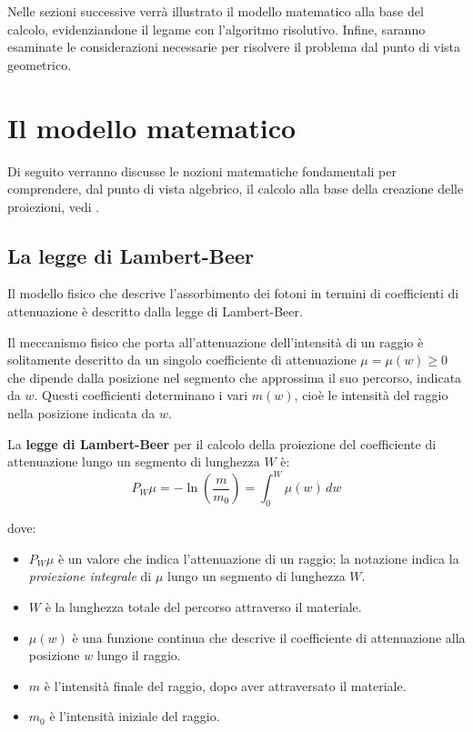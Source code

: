 \documentclass[12pt,a4paper]{report}
\begin{document}
Nelle sezioni successive verrà illustrato il modello matematico alla base del calcolo, evidenziandone il legame con l'algoritmo
risolutivo.
Infine, saranno esaminate le considerazioni necessarie per risolvere il problema dal punto di vista geometrico.

\section{Il modello matematico}

Di seguito verranno discusse le nozioni matematiche fondamentali per comprendere, dal punto di vista algebrico, il calcolo
alla base della creazione delle proiezioni, vedi \cite{MoroLoli2021}.

\subsection{La legge di Lambert-Beer}

Il modello fisico che descrive l'assorbimento dei fotoni in termini di coefficienti di attenuazione è descritto dalla legge di
Lambert-Beer.

Il meccanismo fisico che porta all'attenuazione dell'intensità di un raggio è solitamente descritto da un singolo coefficiente di
attenuazione \(\mu = \mu(w) \ge 0\) che dipende dalla posizione nel segmento che approssima il suo percorso, indicata da \(w\).
Questi coefficienti determinano i vari \(m(w)\), cioè le intensità del raggio nella posizione indicata da \(w\).

La \textbf{legge di Lambert-Beer} per il calcolo della proiezione del coefficiente di attenuazione lungo un segmento di lunghezza
\(W\) è:
\begin{equation} \label{eq:law_lambert-beer}
  P_W\mu = - \ln{(\frac{m}{m_0})} = \int_0^W \mu(w) \, dw
\end{equation}

dove:
\begin{itemize}
  \item \(P_W\mu\) è un valore che indica l'attenuazione di un raggio; la notazione indica la \textit{proiezione integrale} di
        \(\mu\) lungo un segmento di lunghezza \(W\).
  \item \(W\) è la lunghezza totale del percorso attraverso il materiale.
  \item \(\mu(w)\) è una funzione continua che descrive il coefficiente di attenuazione alla posizione \(w\) lungo il raggio.
  \item \(m\) è l'intensità finale del raggio, dopo aver attraversato il materiale.
  \item \(m_0\) è l'intensità iniziale del raggio.
\end{itemize}
\end{document}
